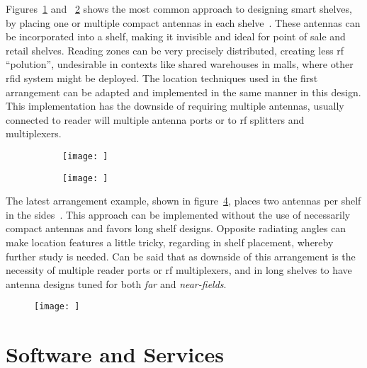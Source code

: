 Figures~\ref{fig:position2} and ~\ref{fig:position3} shows the most common approach to designing smart shelves, by placing one or multiple compact antennas in each shelve~\cite{markakisSafeEfficientDesign2014}.
These antennas can be incorporated into a shelf, making it invisible and ideal for point of sale and retail shelves.
Reading zones can be very precisely distributed, creating less \ac{rf} ``polution'', undesirable in contexts like shared warehouses in malls, where other \ac{rfid} system might be deployed.
The location techniques used in the first arrangement can be adapted and implemented in the same manner in this design.
This implementation has the downside of requiring multiple antennas, usually connected to reader will multiple antenna ports or to \ac{rf} splitters and multiplexers.

\begin{figure}[!ht]
    \centering
    \begin{subfigure}{.45\textwidth}
        \centering
        \texttt{[image: ]}
        \caption{} 
        \label{fig:position2}
    \end{subfigure}
    \begin{subfigure}{.45\textwidth}
        \centering
        \texttt{[image: ]}
        \caption{} 
        \label{fig:position3}
    \end{subfigure}
    \caption{} 
    \label{fig:}
\end{figure}

The latest arrangement example, shown in figure~\ref{fig:position4}, places two antennas per shelf in the sides~\cite{markakisRFIDenabledLibraryManagement2013}. This approach can be implemented without the use of necessarily compact antennas and favors long shelf designs.
Opposite radiating angles can make location features a little tricky, regarding in shelf placement, whereby further study is needed.
Can be said that as downside of this arrangement is the necessity of multiple reader ports or \ac{rf} multiplexers, and in long shelves to have antenna designs tuned for both \emph{far} and \emph{near-fields}.

\begin{figure}[!ht]
    \centering
    \texttt{[image: ]}
    \caption{} 
    \label{fig:position4}
\end{figure}

\section{Software and Services}

